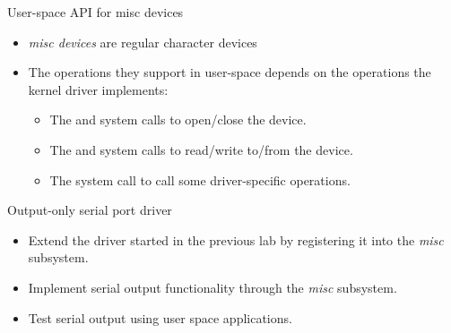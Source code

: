 \begin{frame}{User-space API for misc devices}
  \begin{itemize}
  \item {\em misc devices} are regular character devices
  \item The operations they support in user-space depends on the
    operations the kernel driver implements:
    \begin{itemize}
    \item The  and  system calls to
      open/close the device.
    \item The  and  system calls to
      read/write to/from the device.
    \item The  system call to call some driver-specific
      operations.
    \end{itemize}
  \end{itemize}
\end{frame}

\setuplabframe
{Output-only serial port driver}
{
  \begin{itemize}
  \item Extend the driver started in the previous lab by registering
    it into the {\em misc} subsystem.
  \item Implement serial output functionality through the {\em misc}
    subsystem.
  \item Test serial output using user space applications.
  \end{itemize}
}
